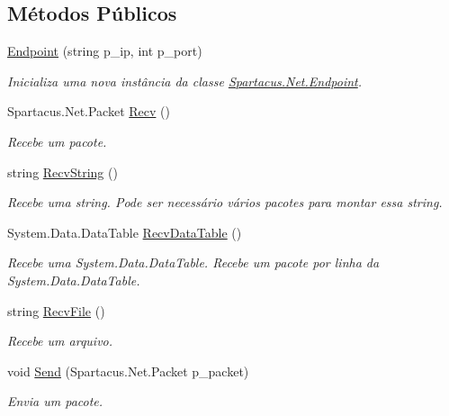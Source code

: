 \subsection*{Métodos Públicos}
\begin{DoxyCompactItemize}
\item 
\hyperlink{classSpartacus_1_1Net_1_1Endpoint_a8edbe7e16bf35d86dc1f8d23a0f968ab}{Endpoint} (string p\+\_\+ip, int p\+\_\+port)
\begin{DoxyCompactList}\small\item\em Inicializa uma nova instância da classe \hyperlink{classSpartacus_1_1Net_1_1Endpoint}{Spartacus.\+Net.\+Endpoint}. \end{DoxyCompactList}\item 
Spartacus.\+Net.\+Packet \hyperlink{classSpartacus_1_1Net_1_1Endpoint_ac53736c6dd5f18b73409ff5a1df2bdb8}{Recv} ()
\begin{DoxyCompactList}\small\item\em Recebe um pacote. \end{DoxyCompactList}\item 
string \hyperlink{classSpartacus_1_1Net_1_1Endpoint_ab4b631ddbd930e4ee77e5840fd3ce14e}{Recv\+String} ()
\begin{DoxyCompactList}\small\item\em Recebe uma string. Pode ser necessário vários pacotes para montar essa string. \end{DoxyCompactList}\item 
System.\+Data.\+Data\+Table \hyperlink{classSpartacus_1_1Net_1_1Endpoint_a77b7337d19232f701d9309bb3b49d81b}{Recv\+Data\+Table} ()
\begin{DoxyCompactList}\small\item\em Recebe uma System.\+Data.\+Data\+Table. Recebe um pacote por linha da System.\+Data.\+Data\+Table. \end{DoxyCompactList}\item 
string \hyperlink{classSpartacus_1_1Net_1_1Endpoint_a6da241dad3b4cdfc193188b03089b8ed}{Recv\+File} ()
\begin{DoxyCompactList}\small\item\em Recebe um arquivo. \end{DoxyCompactList}\item 
void \hyperlink{classSpartacus_1_1Net_1_1Endpoint_a4f29f6186c156ad87017d6138e2e386d}{Send} (Spartacus.\+Net.\+Packet p\+\_\+packet)
\begin{DoxyCompactList}\small\item\em Envia um pacote. \end{DoxyCompactList}\item 

\end{DoxyCompactItemize}
